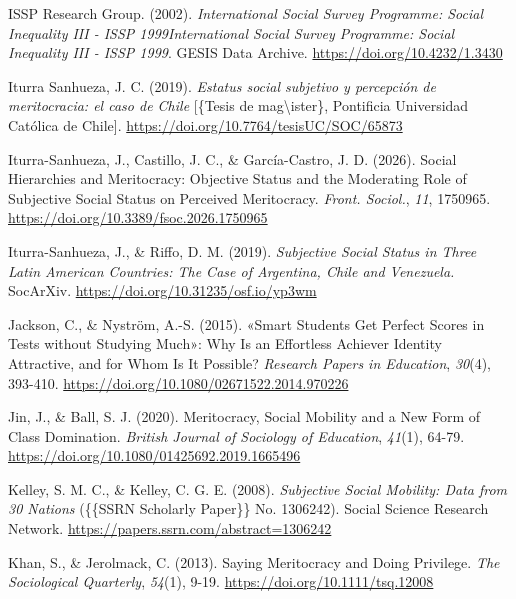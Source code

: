 \documentclass[
  spanish,
  a4paper,
  oneside]{scrbook}
\newlength{\cslhangindent}
\newenvironment{CSLReferences}[2] %
 {\begin{list}{}{%
  \setlength{\itemindent}{0pt}
  \setlength{\leftmargin}{0pt}
  \setlength{\parsep}{0pt}
  \ifodd #1
   \setlength{\leftmargin}{\cslhangindent}
   \setlength{\itemindent}{-1\cslhangindent}
  \fi
  \setlength{\itemsep}{#2\baselineskip}}}
 {\end{list}}
\begin{document}
\begin{CSLReferences}{1}{0}
ISSP Research Group. (2002). \emph{International {Social Survey
Programme}: {Social Inequality III} - {ISSP 1999International Social
Survey Programme}: {Social Inequality III} - {ISSP} 1999}. GESIS Data
Archive. \url{https://doi.org/10.4232/1.3430}

Iturra Sanhueza, J. C. (2019). \emph{{Estatus social subjetivo y
percepción de meritocracia: el caso de Chile}} {[}\{Tesis de
mag\textbackslash\textquotesingle ister\}, Pontificia Universidad
Católica de Chile{]}. \url{https://doi.org/10.7764/tesisUC/SOC/65873}

Iturra-Sanhueza, J., Castillo, J. C., \& García-Castro, J. D. (2026).
Social Hierarchies and Meritocracy: Objective Status and the Moderating
Role of Subjective Social Status on Perceived Meritocracy. \emph{Front.
Sociol.}, \emph{11}, 1750965.
\url{https://doi.org/10.3389/fsoc.2026.1750965}

Iturra-Sanhueza, J., \& Riffo, D. M. (2019). \emph{Subjective Social
Status in Three {Latin American} Countries: {The} Case of {Argentina},
{Chile} and {Venezuela}.} SocArXiv.
\url{https://doi.org/10.31235/osf.io/yp3wm}

Jackson, C., \& Nyström, A.-S. (2015). {«{Smart} Students Get Perfect
Scores in Tests without Studying Much»}: Why Is an Effortless Achiever
Identity Attractive, and for Whom Is It Possible? \emph{Research Papers
in Education}, \emph{30}(4), 393-410.
\url{https://doi.org/10.1080/02671522.2014.970226}

Jin, J., \& Ball, S. J. (2020). Meritocracy, Social Mobility and a New
Form of Class Domination. \emph{British Journal of Sociology of
Education}, \emph{41}(1), 64-79.
\url{https://doi.org/10.1080/01425692.2019.1665496}

Kelley, S. M. C., \& Kelley, C. G. E. (2008). \emph{Subjective {Social
Mobility}: {Data} from 30 {Nations}} (\{\{SSRN Scholarly Paper\}\} No.
1306242). Social Science Research Network.
\url{https://papers.ssrn.com/abstract=1306242}

Khan, S., \& Jerolmack, C. (2013). Saying {Meritocracy} and {Doing
Privilege}. \emph{The Sociological Quarterly}, \emph{54}(1), 9-19.
\url{https://doi.org/10.1111/tsq.12008}


\end{CSLReferences}
\end{document}
